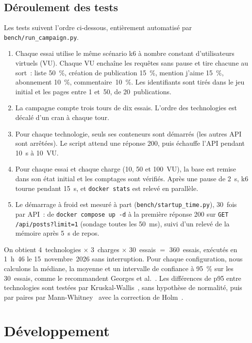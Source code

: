 \documentclass[conference,a4paper]{IEEEtran}
\begin{document}
\subsection{Déroulement des tests}
Les tests suivent l'ordre ci-dessous, entièrement automatisé par
\texttt{bench/run\_campaign.py}.
\begin{enumerate}
\item Chaque essai utilise le même scénario k6 à nombre constant
d'utilisateurs virtuels (VU). Chaque VU enchaîne les requêtes sans
pause et tire chacune au sort~: liste 50~\%, création de publication
15~\%, mention \og j'aime \fg{} 15~\%, abonnement 10~\%,
commentaire~10~\%. Les identifiants sont tirés dans le jeu initial et
les pages entre 1 et~50, de 20~publications.
\item La campagne compte trois tours de dix essais. L'ordre des
technologies est décalé d'un cran à chaque tour.
\item Pour chaque technologie, seuls ses conteneurs sont démarrés (les
autres API sont arrêtées). Le script attend une réponse 200, puis
échauffe l'API pendant 10~s à 10~VU.
\item Pour chaque essai et chaque charge (10, 50 et 100~VU), la base
est remise dans son état initial et les comptages sont vérifiés. Après
une pause de 2~s, k6 tourne pendant 15~s, et \texttt{docker stats} est
relevé en parallèle.
\item Le démarrage à froid est mesuré à part
(\texttt{bench/startup\_time.py}), 30~fois par API~: de
\texttt{docker compose up -d} à la première réponse 200 sur
\texttt{GET /api/posts?limit=1} (sondage toutes les 50~ms), suivi d'un
relevé de la mémoire après 5~s de repos.
\end{enumerate}
On obtient 4~technologies $\times$ 3~charges $\times$ 30~essais
$=$ 360~essais, exécutés en 1~h~46 le 15~novembre~2026 sans
interruption. Pour chaque configuration, nous calculons la médiane, la
moyenne et un intervalle de confiance à 95~\% sur les 30~essais, comme
le recommandent Georges et al.~\cite{georges}. Les différences de p95
entre technologies sont testées par Kruskal-Wallis~\cite{kruskal},
sans hypothèse de normalité, puis par paires par
Mann-Whitney~\cite{mannwhitney} avec la correction de Holm~\cite{holm}.

\section{Développement}\label{sec:dev}
\end{document}
